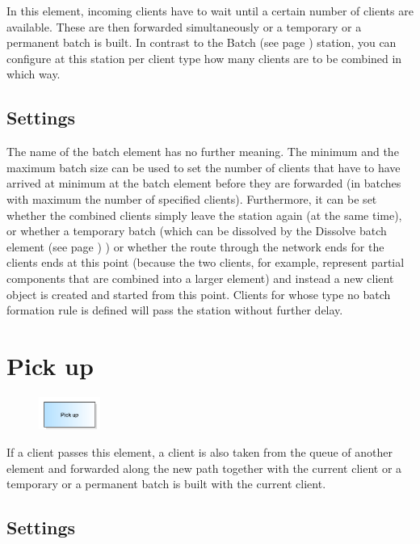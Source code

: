 In this element, incoming clients have to wait until a certain number of clients are available.
These are then forwarded simultaneously or a temporary or a permanent batch is built.
In contrast to the Batch (see page \pageref{ref:ModelElementBatch}) station, you can configure
at this station per client type how many clients are to be combined in which way.

\subsection*{Settings}

The name of the batch element has no further meaning. The minimum and the maximum batch size can be used
to set the number of clients that have to have arrived at minimum at the batch element before they are
forwarded (in batches with maximum the number of specified clients). Furthermore, it can be set whether
the combined clients simply leave the station again (at the same time), or whether a temporary batch (which
can be dissolved by the Dissolve batch element (see page \pageref{ref:ModelElementSeparate}) ) or whether the route
through the network ends for the clients ends at this point (because the two clients, for example, represent
partial components that are combined into a larger element) and instead a new client object is created and
started from this point.
Clients for whose type no batch formation rule is defined will pass the station without further delay.


\section{Pick up}
\label{ref:ModelElementPickUp}

\begin{figure}
\vspace{-22pt}
\includegraphics[width=2cm]{imageModelElementPickUp.png}
\vspace{-22pt}
\end{figure}

If a client passes this element, a client is also taken from the queue of another element and forwarded
along the new path together with the current client or a temporary or a permanent batch is built with the
current client.

\subsection*{Settings}

